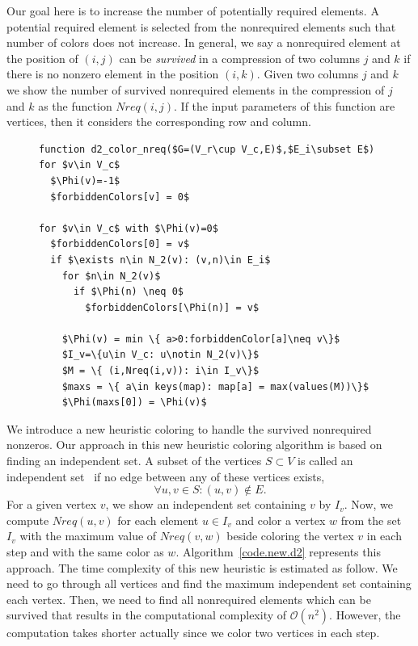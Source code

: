 \documentclass[11pt, twoside,a4paper]{book}
\newcommand{\coderef}[1]{Algorithm~\protect\ref{#1}}
\begin{document}
Our goal here is to increase the number of potentially required elements.
A potential required element is selected from the nonrequired elements such that
number of colors does not increase.
In general, we say a nonrequired element at the position of $(i,j)$
can be \textit{survived} in a compression of two columns $j$ and $k$
if there is no nonzero element in the position $(i,k)$.
Given two columns $j$ and $k$
we show the number of survived nonrequired elements in the compression of
$j$ and $k$ as the function $Nreq(i,j)$.
If the input parameters of this function are vertices,
then it considers the corresponding row and column.
\begin{figure}
\begin{lstlisting}[caption=New coloring heuristic for distance-$2$ coloring
considering the nonrequired elements.,label=code.new.d2,mathescape]
function d2_color_nreq($G=(V_r\cup V_c,E)$,$E_i\subset E$)
for $v\in V_c$
  $\Phi(v)=-1$
  $forbiddenColors[v] = 0$

for $v\in V_c$ with $\Phi(v)=0$
  $forbiddenColors[0] = v$
  if $\exists n\in N_2(v): (v,n)\in E_i$
    for $n\in N_2(v)$
      if $\Phi(n) \neq 0$
        $forbiddenColors[\Phi(n)] = v$

    $\Phi(v) = min \{ a>0:forbiddenColor[a]\neq v\}$
    $I_v=\{u\in V_c: u\notin N_2(v)\}$
    $M = \{ (i,Nreq(i,v)): i\in I_v\}$
    $maxs = \{ a\in keys(map): map[a] = max(values(M))\}$
    $\Phi(maxs[0]) = \Phi(v)$
\end{lstlisting}
\end{figure}
We introduce a new heuristic coloring to handle the survived nonrequired nonzeros.
Our approach in this new heuristic coloring algorithm is based on finding an independent set.
A subset of the vertices $S\subset V$ is
called an independent set~\cite{bondy2008graph} if no edge between any of these vertices exists,
$$\forall u,v\in S: (u,v)\notin E.$$
For a given vertex $v$, we show an independent set containing $v$ by $I_v$.
Now, we compute $Nreq(u,v)$ for each element $u\in I_v$
and color a vertex $w$ from the set $I_v$ with the maximum value of $Nreq(v,w)$
beside coloring the vertex $v$ in each step and with the same color as $w$.
\coderef{code.new.d2} represents this approach.
The time complexity of this new heuristic is estimated as follow.
We need to go through all vertices
and find the maximum independent set containing each vertex.
Then, we need to find all nonrequired elements which can be survived
that results in the computational complexity of $\mathcal{O}(n^2)$.
However, the computation takes shorter actually since we color two vertices in each step.
\end{document}
